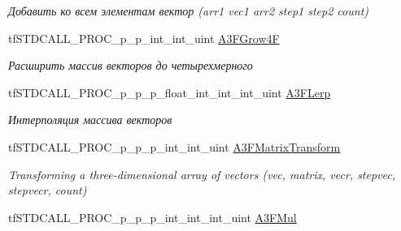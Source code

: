 \begin{DoxyCompactItemize}
\begin{DoxyCompactList}\small\item\em Добавить ко всем элементам вектор (arr1 vec1 arr2 step1 step2 count) \end{DoxyCompactList}\item 
\hypertarget{structs_functions_array_vector_c_p_u_a7fc222520a6b3839d8eda5ad9acf3050}{tf\-S\-T\-D\-C\-A\-L\-L\-\_\-\-P\-R\-O\-C\-\_\-p\-\_\-p\-\_\-int\-\_\-int\-\_\-uint \hyperlink{structs_functions_array_vector_c_p_u_a7fc222520a6b3839d8eda5ad9acf3050}{A3\-F\-Grow4\-F}}\label{structs_functions_array_vector_c_p_u_a7fc222520a6b3839d8eda5ad9acf3050}

\begin{DoxyCompactList}\small\item\em Расширить массив векторов до четырехмерного \end{DoxyCompactList}\item 
\hypertarget{structs_functions_array_vector_c_p_u_a89f30ea5c42fd07521573d3572205766}{tf\-S\-T\-D\-C\-A\-L\-L\-\_\-\-P\-R\-O\-C\-\_\-p\-\_\-p\-\_\-p\-\_\-float\-\_\-int\-\_\-int\-\_\-int\-\_\-uint \hyperlink{structs_functions_array_vector_c_p_u_a89f30ea5c42fd07521573d3572205766}{A3\-F\-Lerp}}\label{structs_functions_array_vector_c_p_u_a89f30ea5c42fd07521573d3572205766}

\begin{DoxyCompactList}\small\item\em Интерполяция массива векторов \end{DoxyCompactList}\item 
\hypertarget{structs_functions_array_vector_c_p_u_a53ef6bd3edb3a7555c8fb0f60a423422}{tf\-S\-T\-D\-C\-A\-L\-L\-\_\-\-P\-R\-O\-C\-\_\-p\-\_\-p\-\_\-p\-\_\-int\-\_\-int\-\_\-uint \hyperlink{structs_functions_array_vector_c_p_u_a53ef6bd3edb3a7555c8fb0f60a423422}{A3\-F\-Matrix\-Transform}}\label{structs_functions_array_vector_c_p_u_a53ef6bd3edb3a7555c8fb0f60a423422}

\begin{DoxyCompactList}\small\item\em Transforming a three-\/dimensional array of vectors (vec, matrix, vecr, stepvec, stepvecr, count) \end{DoxyCompactList}\item 
\hypertarget{structs_functions_array_vector_c_p_u_a4317ec1f69987656a340914086e66f50}{tf\-S\-T\-D\-C\-A\-L\-L\-\_\-\-P\-R\-O\-C\-\_\-p\-\_\-p\-\_\-p\-\_\-int\-\_\-int\-\_\-int\-\_\-uint \hyperlink{structs_functions_array_vector_c_p_u_a4317ec1f69987656a340914086e66f50}{A3\-F\-Mul}}\label{structs_functions_array_vector_c_p_u_a4317ec1f69987656a340914086e66f50}


\end{DoxyCompactItemize}
